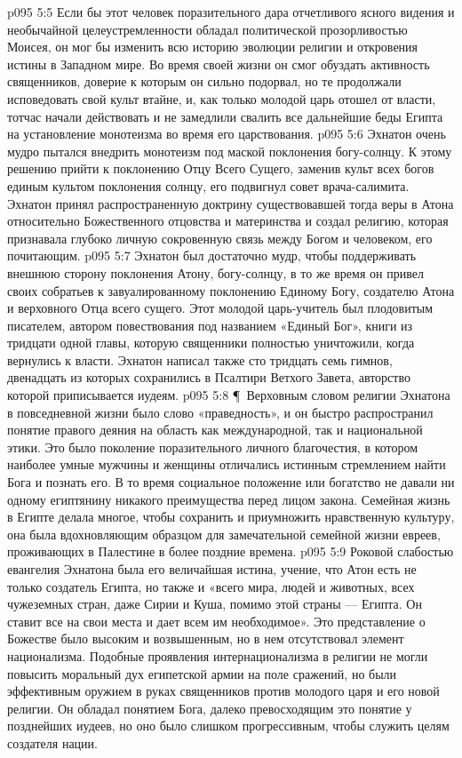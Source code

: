 \vs p095 5:5 Если бы этот человек поразительного дара отчетливого ясного видения и необычайной целеустремленности обладал политической прозорливостью Моисея, он мог бы изменить всю историю эволюции религии и откровения истины в Западном мире. Во время своей жизни он смог обуздать активность священников, доверие к которым он сильно подорвал, но те продолжали исповедовать свой культ втайне, и, как только молодой царь отошел от власти, тотчас начали действовать и не замедлили свалить все дальнейшие беды Египта на установление монотеизма во время его царствования.
\vs p095 5:6 Эхнатон очень мудро пытался внедрить монотеизм под маской поклонения богу\hyp{}солнцу. К этому решению прийти к поклонению Отцу Всего Сущего, заменив культ всех богов единым культом поклонения солнцу, его подвигнул совет врача\hyp{}салимита. Эхнатон принял распространенную доктрину существовавшей тогда веры в Атона относительно Божественного отцовства и материнства и создал религию, которая признавала глубоко личную сокровенную связь между Богом и человеком, его почитающим.
\vs p095 5:7 Эхнатон был достаточно мудр, чтобы поддерживать внешнюю сторону поклонения Атону, богу\hyp{}солнцу, в то же время он привел своих собратьев к завуалированному поклонению Единому Богу, создателю Атона и верховного Отца всего сущего. Этот молодой царь\hyp{}учитель был плодовитым писателем, автором повествования под названием «Единый Бог», книги из тридцати одной главы, которую священники полностью уничтожили, когда вернулись к власти. Эхнатон написал также сто тридцать семь гимнов, двенадцать из которых сохранились в Псалтири Ветхого Завета, авторство которой приписывается иудеям.
\vs p095 5:8 \P\ Верховным словом религии Эхнатона в повседневной жизни было слово «праведность», и он быстро распространил понятие правого деяния на область как международной, так и национальной этики. Это было поколение поразительного личного благочестия, в котором наиболее умные мужчины и женщины отличались истинным стремлением найти Бога и познать его. В то время социальное положение или богатство не давали ни одному египтянину никакого преимущества перед лицом закона. Семейная жизнь в Египте делала многое, чтобы сохранить и приумножить нравственную культуру, она была вдохновляющим образцом для замечательной семейной жизни евреев, проживающих в Палестине в более поздние времена.
\vs p095 5:9 Роковой слабостью евангелия Эхнатона была его величайшая истина, учение, что Атон есть не только создатель Египта, но также и «всего мира, людей и животных, всех чужеземных стран, даже Сирии и Куша, помимо этой страны --- Египта. Он ставит все на свои места и дает всем им необходимое». Это представление о Божестве было высоким и возвышенным, но в нем отсутствовал элемент национализма. Подобные проявления интернационализма в религии не могли повысить моральный дух египетской армии на поле сражений, но были эффективным оружием в руках священников против молодого царя и его новой религии. Он обладал понятием Бога, далеко превосходящим это понятие у позднейших иудеев, но оно было слишком прогрессивным, чтобы служить целям создателя нации.

